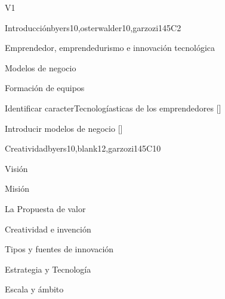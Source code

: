 \begin{syllabus}
\begin{competences}{V1}
\end{competences}



\begin{unit}{}{Introducción}{byers10,osterwalder10,garzozi14}{5}{C2}
\begin{topics}
      \item Emprendedor, emprendedurismo e innovación tecnológica
      \item Modelos de negocio
      \item Formación de equipos
   \end{topics}

    \begin{learningoutcomes} 
      \item Identificar caracterTecnologíasticas de los emprendedores  [\Familiarity]
      \item Introducir modelos de negocio  [\Familiarity]
    \end{learningoutcomes} 
\end{unit}

\begin{unit}{}{Creatividad}{byers10,blank12,garzozi14}{5}{C10}
\begin{topics}
      \item Visión
      \item Misión
      \item La Propuesta de valor
      \item Creatividad e invención
      \item Tipos y fuentes de innovación
      \item Estrategia y Tecnología
      \item Escala y ámbito
   \end{topics}


\end{unit}
\end{syllabus}
